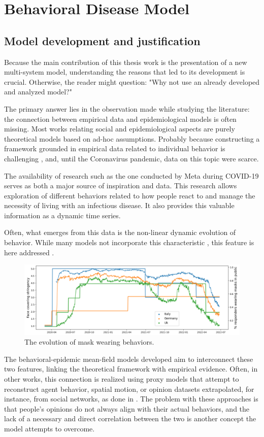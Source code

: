 \part{Behavioral Disease Model}
\label{part:the_model}
\chapter{Model development and justification}
Because the main contribution of this thesis work is the presentation of a new multi-system model, understanding the reasons that led to its development is crucial.
Otherwise, the reader might question: "Why not use an already developed and analyzed model?"

The primary answer lies in the observation made while studying the literature: the connection between empirical data and epidemiological models is often missing. Most works relating social and epidemiological aspects are purely theoretical models based on ad-hoc assumptions. Probably because constructing a framework grounded in empirical data related to individual behavior is challenging \cite{Nunner2021}, and, until the Coronavirus pandemic, data on this topic were scarce.

The availability of research such as the one conducted by Meta during COVID-19 \cite{Astley_2021} serves as both a major source of inspiration and data. This research allows exploration of different behaviors related to how people react to and manage the necessity of living with an infectious disease. It also provides this valuable information as a dynamic time series.

Often, what emerges from this data is the non-linear dynamic evolution of behavior. While many models not incorporate this characteristic \cite{huys2010nonlinear}, this feature is here addressed .
\begin{figure}[h]
	\centering
	\includegraphics[width=0.8\linewidth]{1_corpo/figure/Fig2cut}
	\caption[Mask wearing evolution]{The evolution of mask wearing behaviors.}
	\label{fig:mask_wearing}
\end{figure}
The behavioral-epidemic mean-field models developed aim to interconnect these two features, linking the theoretical framework with empirical evidence. Often, in other works, this connection is realized using proxy models that attempt to reconstruct agent behavior, spatial motion, or opinion datasets extrapolated, for instance, from social networks, as done in \cite{Anderson_2019,Zino_2021}. The problem with these approaches is that people's opinions do not always align with their actual behaviors, and the lack of a necessary and direct correlation between the two is another concept the model attempts to overcome.

